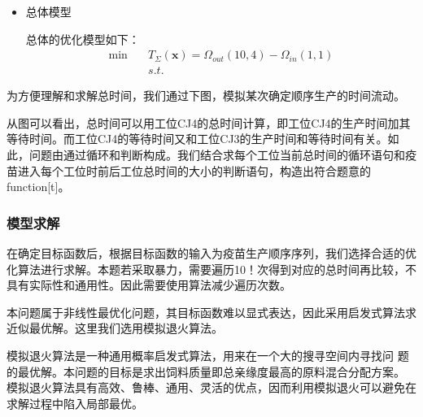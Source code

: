 \documentclass[UTF8]{ctexart}
\begin{document}
\begin{itemize}
	\item 总体模型
	\par 总体的优化模型如下：
	\begin{equation}
		\begin{split}
		\min \quad&T_{\Sigma}(\boldsymbol{x})=\Omega_{out}(10,4)-\Omega_{in}(1,1)\\
		&s.t. 
		\end{split}
	\end{equation}

	\end{itemize}
	
	为方便理解和求解总时间，我们通过下图，模拟某次确定顺序生产的时间流动。

	从图可以看出，总时间可以用工位CJ4的总时间计算，即工位CJ4的生产时间加其等待时间。而工位CJ4的等待时间又和工位CJ3的生产时间和等待时间有关。如此，问题由通过循环和判断构成。我们结合求每个工位当前总时间的循环语句和疫苗进入每个工位时前后工位总时间的大小的判断语句，构造出符合题意的function[t]。
	
	\subsubsection{模型求解}
	
	在确定目标函数后，根据目标函数的输入为疫苗生产顺序序列，我们选择合适的优化算法进行求解。本题若采取暴力，需要遍历10！次得到对应的总时间再比较，不具有实际性和通用性。因此需要使用算法减少遍历次数。
	
	本问题属于非线性最优化问题，其目标函数难以显式表达，因此采用启发式算法求近似最优解。这里我们选用模拟退火算法。 
	
	模拟退火算法是一种通用概率启发式算法，用来在一个大的搜寻空间内寻找问 题的最优解。本问题的目标是求出饲料质量即总亲缘度最高的原料混合分配方案。 模拟退火算法具有高效、鲁棒、通用、灵活的优点，因而利用模拟退火可以避免在 求解过程中陷入局部最优。
	
\end{document}
